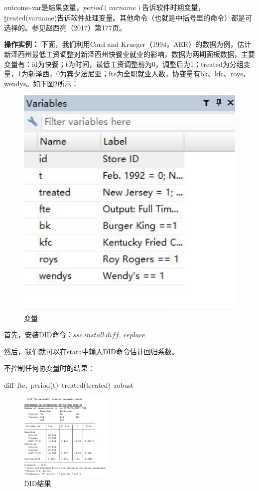 \documentclass[cn,12pt,math=newtx,citestyle=gb7714-2015,bibstyle=gb7714-2015]{elegantbook}
\begin{document}
	outcome-var是结果变量，$\underline{p}eriod(varname)$告诉软件时期变量，\underline{t}reated(varname)告诉软件处理变量。其他命令（也就是中括号里的命令）都是可选择的。参见赵西亮（2017）第177页。
	
	\textbf{操作实例：}
	下面，我们利用Card and Krueger（1994，AER）的数据为例，估计新泽西州最低工资调整对新泽西州快餐业就业的影响，数据为两期面板数据，主要变量有：id为快餐；t为时间，最低工资调整前为0，调整后为1；treated为分组变量，1为新泽西，0为宾夕法尼亚；fte为全职就业人数，协变量有bk、kfc、roys、wendys。如下图2所示：
	\begin{figure}[htbp!]
		\centering
		\includegraphics[width=1\textwidth]{var.jpg}
		\caption{变量}\label{fig:digit}
	\end{figure}
	
	首先，安装DID命令：$ssc~install~diff,~replace$
	
	然后，我们就可以在stata中输入DID命令估计回归系数。
	
	不控制任何协变量时的结果：
	
	diff~fte,~period(t)~treated(treated)~robust
	\begin{figure}[htbp!]
		\centering
		\includegraphics[width=0.4\textwidth]{DIDresults.jpg}
		\caption{DID结果}\label{fig:digit}
	\end{figure}
	
\end{document}
